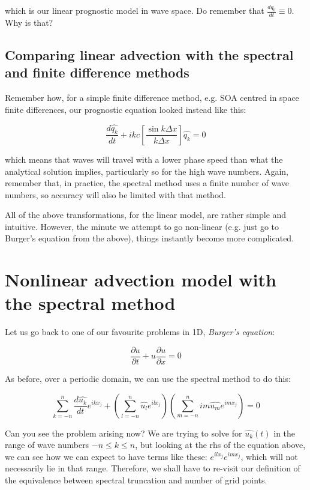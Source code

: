 which is our linear prognostic model in wave space. Do remember that $\frac{dq_0}{dt} \equiv 0$. Why is that?


\subsection{Comparing linear advection with the spectral and finite difference methods}
Remember how, for a simple finite difference method, e.g. SOA centred in space finite differences, our prognostic equation looked instead like this:

\begin{equation}
	\frac{d \widehat{q_k}}{d t}  + ikc \left[   \frac {\sin k \Delta x}{k\Delta x}  \right]  \widehat{q_k} = 0 
	\label{FD_linear_advection}
\end{equation}

which means that waves will travel with a lower phase speed than what the analytical solution implies, particularly so for the high wave numbers. Again, remember that, in practice, the spectral method uses a finite number of wave numbers, so accuracy will also be limited with that method.

All of the above transformations, for the linear model, are rather simple and intuitive. However, the minute we attempt to go non-linear (e.g. just go to Burger's equation from the above), things instantly become more complicated.

\section{Nonlinear advection model with the spectral method}
Let us go back to one of our favourite problems in 1D, \emph{Burger's equation}:

\begin{equation}
	\frac{\partial u}{\partial t} + u	\frac{\partial u}{\partial x} = 0
\end{equation}

As before, over a periodic domain, we can use the spectral method to do this:

\begin{equation}
	\sum_{k=-n}^{n} 	\frac{d \widehat{u_k}}{d t}  e^{ikx_j} +  \left( \sum_{l=-n}^{n}  \widehat{u_l} e^{ilx_j} \right)  \left(  \sum_{m=-n}^{n} 	im \widehat{u_m} e^{imx_j} \right)  = 0
\end{equation}

Can you see the problem arising now? We are trying to solve for $\widehat{u_k}(t)$ in the range of wave numbers $-n \le k \le n$, but looking at the rhs of the equation above, we can see how we can expect to have terms like these: $e^{ilx_j}e^{imx_j}$, which will not necessarily lie in that range. Therefore, we shall have to re-visit our definition of the equivalence between spectral truncation and number of grid points.

